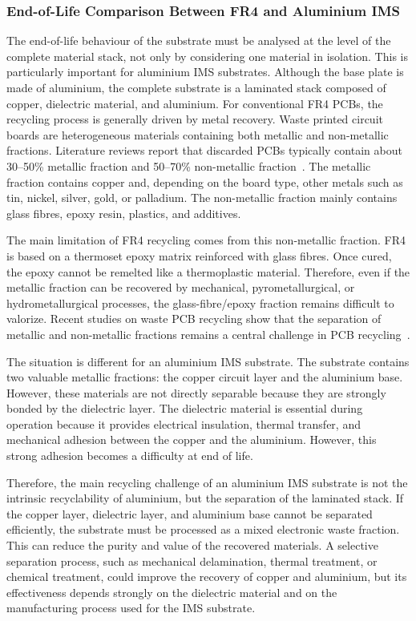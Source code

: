 \subsubsection{End-of-Life Comparison Between FR4 and Aluminium IMS}

The end-of-life behaviour of the substrate must be analysed at the level of the complete material stack, not only by considering one material in isolation. This is particularly important for aluminium IMS substrates. Although the base plate is made of aluminium, the complete substrate is a laminated stack composed of copper, dielectric material, and aluminium.
For conventional FR4 PCBs, the recycling process is generally driven by metal recovery. Waste printed circuit boards are heterogeneous materials containing both metallic and non-metallic fractions. Literature reviews report that discarded PCBs typically contain about 30--50\% metallic fraction and 50--70\% non-metallic fraction~\cite{dpcb_review_2024}. The metallic fraction contains copper and, depending on the board type, other metals such as tin, nickel, silver, gold, or palladium. The non-metallic fraction mainly contains glass fibres, epoxy resin, plastics, and additives.

The main limitation of FR4 recycling comes from this non-metallic fraction. FR4 is based on a thermoset epoxy matrix reinforced with glass fibres. Once cured, the epoxy cannot be remelted like a thermoplastic material. Therefore, even if the metallic fraction can be recovered by mechanical, pyrometallurgical, or hydrometallurgical processes, the glass-fibre/epoxy fraction remains difficult to valorize. Recent studies on waste PCB recycling show that the separation of metallic and non-metallic fractions remains a central challenge in PCB recycling~\cite{duarte2023separation}.

The situation is different for an aluminium IMS substrate. The substrate contains two valuable metallic fractions: the copper circuit layer and the aluminium base. However, these materials are not directly separable because they are strongly bonded by the dielectric layer. The dielectric material is essential during operation because it provides electrical insulation, thermal transfer, and mechanical adhesion between the copper and the aluminium. However, this strong adhesion becomes a difficulty at end of life.

Therefore, the main recycling challenge of an aluminium IMS substrate is not the intrinsic recyclability of aluminium, but the separation of the laminated stack. If the copper layer, dielectric layer, and aluminium base cannot be separated efficiently, the substrate must be processed as a mixed electronic waste fraction. This can reduce the purity and value of the recovered materials. A selective separation process, such as mechanical delamination, thermal treatment, or chemical treatment, could improve the recovery of copper and aluminium, but its effectiveness depends strongly on the dielectric material and on the manufacturing process used for the IMS substrate.

